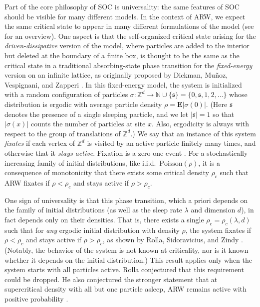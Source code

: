 \documentclass[ECP]{ejpecp} %
\begin{document}
Part of the core philosophy of SOC is universality: the same features of
SOC should be visible for many different models. In the context of ARW,
we expect the same critical state to appear in many different formulations
of the model (see \cite{levine2023universality} for an overview). One aspect
is that the self-organized critical state arising for the
\emph{driven-dissipative} version of the model, where particles are added
to the interior but deleted at the boundary of a finite box, is thought
to be the same as the critical state in a traditional absorbing-state phase
transition for the \emph{fixed-energy} version on an infinite lattice, as
originally proposed by Dickman, Mu\~noz, Vespignani, and Zapperi
\cite{dickman2000paths}. In this fixed-energy model, the system is initialized
with a random configuration of particles
$\sigma \colon \mathbb{Z}^{d} \to \mathbb{N}\cup \{\mathfrak{s}\} =
\{0, \mathfrak{s}, 1, 2, \ldots \}$ whose distribution is ergodic with
average particle density $\rho =\mathbf{E}\mathopen{\lvert }\sigma (0)\mathclose{\rvert }$. (Here
$\mathfrak{s}$ denotes the presence of a single sleeping particle, and
we let $\mathopen{\lvert }\mathfrak{s}\mathclose{\rvert } = 1$ so that $\mathopen{\lvert }\sigma (x)\mathclose{\rvert }$ counts the number
of particles at site $x$. Also, ergodicity is always with respect to the
group of translations of $\mathbb{Z}^{d}$.) We say that an instance of
this system \emph{fixates} if each vertex of $\mathbb{Z}^{d}$ is visited
by an active particle finitely many times, and otherwise that it
\emph{stays active}. Fixation is a zero-one event
\cite[Lemma~4]{rolla2012absorbing}. For a stochastically increasing family
of initial distributions, like i.i.d.\ $\mathrm{Poisson}(\rho )$, it is
a consequence of monotonicity that there exists some critical density
$\rho _{c}$ such that ARW fixates if $\rho <\rho _{c}$ and stays active
if $\rho >\rho _{c}$.

One sign of universality is that this phase transition, which a priori
depends on the family of initial distributions (as well as the sleep rate
$\lambda $ and dimension $d$), in fact depends only on their densities.
That is, there exists a single $\rho _{c}=\rho _{c}(\lambda ,d)$ such that
for \emph{any} ergodic initial distribution with density $\rho $, the system
fixates if $\rho <\rho _{c}$ and stays active if $\rho >\rho _{c}$, as
shown by Rolla, Sidoravicius, and Zindy
\cite{RollaSidoraviciusZindy19}. (Notably, the behavior of the system is
not known at criticality, nor is it known whether it depends on the initial
distribution.) This result applies only when the system starts with all
particles active. Rolla conjectured that this requirement could be dropped.
He also conjectured the stronger statement that at supercritical density
with all but one particle asleep, ARW remains active with positive probability
\cite[p.~517]{rolla2020activated}.
\end{document}

